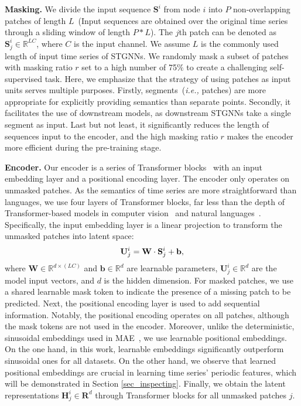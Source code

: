 \documentclass[sigconf]{acmart}
\newcommand{\ie}{\textit{i.e.,}\xspace}
\begin{document}
\noindent \textbf{Masking.} 
{\color{black}
We divide the input sequence $\mathbf{S}^{i}$ from node $i$ into $P$ non-overlapping patches of length $L$~(Input sequences are obtained over the original time series through a sliding window of length $P*L$).
The $j$th patch can be denoted as $\mathbf{S}_j^i\in\mathbb{R}^{LC}$, where $C$ is the input channel.}
We assume $L$ is the commonly used length of input time series of STGNNs.
We randomly mask a subset of patches with masking ratio $r$ set to a high number of 75$\%$ to create a challenging self-supervised task.
Here, we emphasize that the strategy of using patches as input units serves multiple purposes.
Firstly, segments~(\ie patches) are more appropriate for explicitly providing semantics than separate points.
Secondly, it facilitates the use of downstream models, as downstream STGNNs take a single segment as input.
Last but not least, it significantly reduces the length of sequences input to the encoder, and the high masking ratio $r$ makes the encoder more efficient during the pre-training stage.



\noindent \textbf{Encoder.} 
Our encoder is a series of Transformer blocks~\cite{2017Transformer} with an input embedding layer and a positional encoding layer. 
The encoder only operates on unmasked patches.
As the semantics of time series are more straightforward than languages, we use four layers of  Transformer blocks, far less than the depth of Transformer-based models in computer vision~\cite{2020ViT, 2021MAE} and natural languages~\cite{2019BERT, 2020GPT}. 
Specifically, the input embedding layer is a linear projection to transform the unmasked patches into latent space:
\begin{equation}
\setlength\abovedisplayskip{0.2cm}
\setlength\belowdisplayskip{0.2cm}
    \mathbf{U}_j^i = \mathbf{W}\cdot\mathbf{S}^i_j + \mathbf{b},
\end{equation}
where $\mathbf{W}\in\mathbb{R}^{d\times(LC)}$ and $\mathbf{b}\in\mathbb{R}^d$ are learnable parameters, $\mathbf{U}^i_j\in\mathbb{R}^{d}$ are the model input vectors, and $d$ is the hidden dimension.
For masked patches, we use a shared learnable mask token to indicate the presence of a missing patch to be predicted.
Next, the positional encoding layer is used to add sequential information.
Notably, the positional encoding operates on all patches, although the mask tokens are not used in the encoder. 
Moreover, unlike the deterministic, sinusoidal embeddings used in MAE~\cite{2021MAE}, we use learnable positional embeddings. 
On the one hand, in this work, learnable embeddings significantly outperform sinusoidal ones for all datasets. 
On the other hand, we observe that learned positional embeddings are crucial in learning time series' periodic features, which will be demonstrated in Section \ref{sec_inspecting}.
Finally, we obtain the latent representations $\mathbf{H}_j^i\in\mathbf{R}^d$ through Transformer blocks for all unmasked patches $j$.
\end{document}

